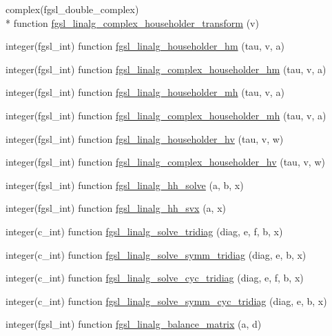 \begin{DoxyCompactItemize}
complex(fgsl\-\_\-double\-\_\-complex) \\*
function \hyperlink{linalg_8finc_a7bd1bfa2419818da7392462ec4e51a49}{fgsl\-\_\-linalg\-\_\-complex\-\_\-householder\-\_\-transform} (v)
\item 
integer(fgsl\-\_\-int) function \hyperlink{linalg_8finc_abbaccde9508cf3805e8fd920e086b306}{fgsl\-\_\-linalg\-\_\-householder\-\_\-hm} (tau, v, a)
\item 
integer(fgsl\-\_\-int) function \hyperlink{linalg_8finc_a6cfd891d07d48aa2404785b7607a8ca1}{fgsl\-\_\-linalg\-\_\-complex\-\_\-householder\-\_\-hm} (tau, v, a)
\item 
integer(fgsl\-\_\-int) function \hyperlink{linalg_8finc_a0215003deddc89a15be1533dcfadd837}{fgsl\-\_\-linalg\-\_\-householder\-\_\-mh} (tau, v, a)
\item 
integer(fgsl\-\_\-int) function \hyperlink{linalg_8finc_a3c2d047dceeba00601c6a049eedb7c58}{fgsl\-\_\-linalg\-\_\-complex\-\_\-householder\-\_\-mh} (tau, v, a)
\item 
integer(fgsl\-\_\-int) function \hyperlink{linalg_8finc_af93afe6e7341885e9672d74b4d113c62}{fgsl\-\_\-linalg\-\_\-householder\-\_\-hv} (tau, v, w)
\item 
integer(fgsl\-\_\-int) function \hyperlink{linalg_8finc_a577aa9f2f2795c9d8d545502e0baae34}{fgsl\-\_\-linalg\-\_\-complex\-\_\-householder\-\_\-hv} (tau, v, w)
\item 
integer(fgsl\-\_\-int) function \hyperlink{linalg_8finc_a0da76044dd77df2922422968347c1d00}{fgsl\-\_\-linalg\-\_\-hh\-\_\-solve} (a, b, x)
\item 
integer(fgsl\-\_\-int) function \hyperlink{linalg_8finc_ae4d2e360e54f77fbdef78af0fd6c8348}{fgsl\-\_\-linalg\-\_\-hh\-\_\-svx} (a, x)
\item 
integer(c\-\_\-int) function \hyperlink{linalg_8finc_ad5daaa9a613e3d9e8668191df02d1d85}{fgsl\-\_\-linalg\-\_\-solve\-\_\-tridiag} (diag, e, f, b, x)
\item 
integer(c\-\_\-int) function \hyperlink{linalg_8finc_a91cd2d731729955df9677ae3e44b4799}{fgsl\-\_\-linalg\-\_\-solve\-\_\-symm\-\_\-tridiag} (diag, e, b, x)
\item 
integer(c\-\_\-int) function \hyperlink{linalg_8finc_a3a0cc14d7736d7e20be30ed7f07f093e}{fgsl\-\_\-linalg\-\_\-solve\-\_\-cyc\-\_\-tridiag} (diag, e, f, b, x)
\item 
integer(c\-\_\-int) function \hyperlink{linalg_8finc_aea909b87fb81242ac465f6651e63f536}{fgsl\-\_\-linalg\-\_\-solve\-\_\-symm\-\_\-cyc\-\_\-tridiag} (diag, e, b, x)
\item 
integer(fgsl\-\_\-int) function \hyperlink{linalg_8finc_a82232b7f631cacda2a903f1d0fae1263}{fgsl\-\_\-linalg\-\_\-balance\-\_\-matrix} (a, d)
\end{DoxyCompactItemize}


